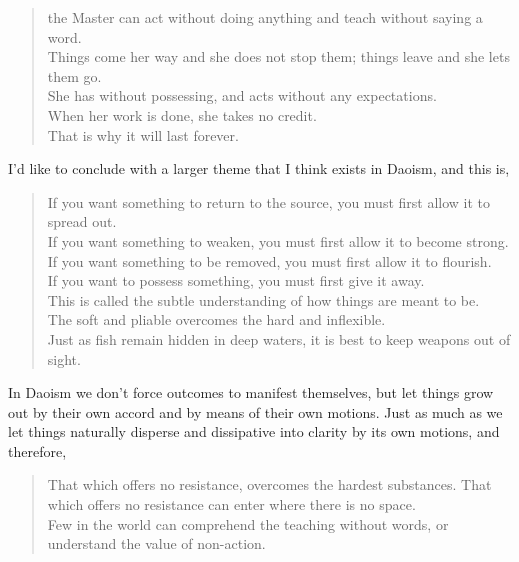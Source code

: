 \begin{verse}
the Master can act without doing anything and teach without saying a word.\\
Things come her way and she does not stop them; things leave and she lets them go.\\
She has without possessing, and acts without any expectations.\\
When her work is done, she takes no credit.\\
That is why it will last forever.\\
\end{verse}

I’d like to conclude with a larger theme that I think exists in Daoism, and this is,


\begin{verse}
If you want something to return to the source, you must first allow it to spread out.\\
If you want something to weaken, you must first allow it to become strong.\\
If you want something to be removed, you must first allow it to flourish.\\
If you want to possess something, you must first give it away.\\
This is called the subtle understanding of how things are meant to be.\\
The soft and pliable overcomes the hard and inflexible.\\
Just as fish remain hidden in deep waters, it is best to keep weapons out of sight.\\
\end{verse}

In Daoism we don’t force outcomes to manifest themselves, but let things grow out by their own accord and by means of their own motions. Just as much as we let things naturally disperse and dissipative into clarity by its own motions, and therefore,

\begin{verse}
That which offers no resistance, overcomes the hardest substances. That which offers no resistance can enter where there is no space.\\
Few in the world can comprehend the teaching without words, or understand the value of non-action.\\
\end{verse}





